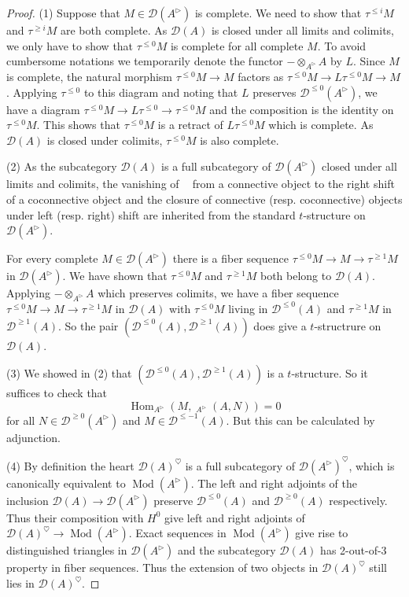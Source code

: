 \documentclass{article}
\theoremstyle{plain}
\theoremstyle{definition}
\theoremstyle{remark}
\DeclareMathOperator{\Hom}{Hom}
\DeclareMathOperator{\Homs}{\underline{Hom}}
\DeclareMathOperator{\rhoms}{\underline{RHom}}
\DeclareMathOperator{\modcat}{Mod}
\newcommand{\huflag}{\triangleright}
\newcommand{\D}{\mathcal{D}}
\newcommand{\heart}{\heartsuit}
\newcommand{\resp}[1]{{\color{respcolor}(resp. #1)}}
\begin{document}
\begin{proof}
(1)
Suppose that $ M \in \D (A ^{\huflag}) $ is complete. We need to show that $ \tau ^{\leq i} M $ and $ \tau ^{\geq i}M $ are both complete.
As $ \D (A) $ is closed under all limits and colimits, we only have to show that $ \tau ^{\leq 0}M $ is complete for all complete $ M $.
To avoid cumbersome notations we temporarily denote the functor $ -\otimes _{A ^{\huflag}} A $ by $ L $.
Since $ M $ is complete, the natural morphism $ \tau ^{\leq 0}M\to M $ factors as $ \tau ^{\leq 0}M\to L \tau ^{\leq 0}M\to M $.
Applying $ \tau ^{\leq 0} $ to this diagram and noting that $ L $ preserves $ \D ^{\leq 0} (A ^{\huflag}) $,
we have a diagram $ \tau ^{\leq 0}M\to L \tau ^{\leq 0}\to \tau ^{\leq 0}M $ and the composition is the identity on $ \tau ^{\leq 0} M $.
This shows that $ \tau ^{\leq 0}M $ is a retract of $ L \tau ^{\leq 0}M $ which is complete.
As $ \D (A) $ is closed under colimits, $ \tau ^{\leq 0}M $ is also complete.

(2)
As the subcategory $ \D (A) $ is a full subcategory of $ \D (A ^{\huflag}) $ closed under all limits and colimits,
the vanishing of $ \rhoms $ from a connective object to the right shift of a coconnective object
and the closure of connective \resp{coconnective} objects under left \resp{right} shift
are inherited from the standard $ t $-structure on $ \D (A ^{\huflag}) $.

For every complete $ M\in \D (A ^{\huflag}) $ there is a fiber sequence
$ \tau ^{\leq 0}M\to M\to \tau ^{\geq 1}M $ in $ \D (A ^{\huflag}) $.
We have shown that $ \tau ^{\leq 0}M $ and $ \tau ^{\geq 1}M $ both belong to $ \D (A) $.
Applying $ -\otimes _{A ^{\huflag}} A $ which preserves colimits, we have a fiber sequence
$ \tau ^{\leq 0}M\to M\to \tau ^{\geq 1}M $ in $ \D (A) $
with $ \tau ^{\leq 0}M $ living in $ \D ^{\leq 0}(A) $ and $ \tau ^{\geq 1}M $ in $ \D ^{\geq 1}(A) $.
So the pair $ (\D ^{\leq 0}(A), \D ^{\geq 1}(A)) $ does give a $ t $-structrure on $ \D (A) $.

(3)
We showed in (2) that $ (\D ^{\leq 0}(A), \D ^{\geq 1}(A)) $ is a $ t $-structure.
So it suffices to check that $$ \Hom _{A ^{\huflag}}(M, \Homs _{A ^{\huflag}}(A, N)) = 0 $$
for all $ N\in \D ^{\geq 0}(A ^{\huflag}) $ and $ M\in \D ^{\leq -1}(A) $.
But this can be calculated by adjunction.

(4)
By definition the heart $ \D (A)^{\heart} $ is a full subcategory of $ \D (A ^{\huflag})^{\heart} $, which is canonically equivalent to 
$ \modcat (A ^{\huflag}) $.
The left and right adjoints of the inclusion $ \D (A)\to \D (A ^{\huflag}) $
preserve $ \D ^{\leq 0}(A) $ and $ \D ^{\geq 0}(A) $ respectively.
Thus their composition with $ H ^{0} $ give left and right adjoints of $ \D (A)^{\heart}\to \modcat (A ^{\huflag}) $.
Exact sequences in $ \modcat (A ^{\huflag}) $ give rise to distinguished triangles in $ \D (A ^{\huflag}) $ and
the subcategory $ \D (A) $ has 2-out-of-3 property in fiber sequences. Thus the extension of two objects in $ \D (A) ^{\heart} $
still lies in $ \D (A) ^{\heart} $.


\end{proof}
\end{document}
